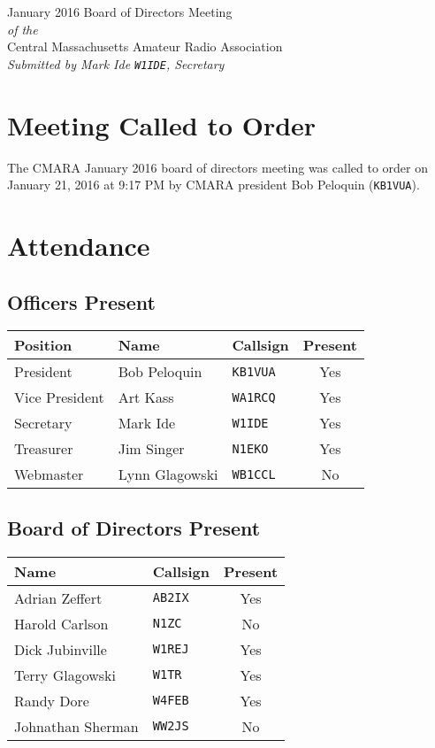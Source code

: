 \documentclass[10pt,letterpaper]{article}
\begin{document}
\begin{center}
{\huge January 2016 Board of Directors Meeting}\\
\emph{of the}\\
{\Large Central Massachusetts Amateur Radio Association}\\
\emph{Submitted by Mark Ide \texttt{W1IDE}, Secretary}
\end{center}

\section{Meeting Called to Order}
The CMARA January 2016 board of directors meeting was called to order on January 21, 2016 at 9:17 PM by CMARA president Bob Peloquin (\texttt{KB1VUA}).

\section{Attendance}

\subsection{Officers Present}

\begin{tabular}{|l|l|l|c|}
  \hline
  \textbf{Position} & \textbf{Name}  & \textbf{Callsign} & \textbf{Present} \\ \hline
  President         & Bob Peloquin   & \texttt{KB1VUA}   & Yes              \\
  Vice President    & Art Kass       & \texttt{WA1RCQ}   & Yes              \\
  Secretary         & Mark Ide       & \texttt{W1IDE}    & Yes              \\
  Treasurer         & Jim Singer     & \texttt{N1EKO}    & Yes              \\
  Webmaster         & Lynn Glagowski & \texttt{WB1CCL}   & No               \\
  \hline
\end{tabular}

\subsection{Board of Directors Present}

\begin{tabular}{|l|l|c|}
  \hline
  \textbf{Name}     & \textbf{Callsign} & \textbf{Present} \\ \hline
  Adrian Zeffert    & \texttt{AB2IX}    & Yes              \\
  Harold Carlson    & \texttt{N1ZC}     & No               \\
  Dick Jubinville   & \texttt{W1REJ}    & Yes              \\
  Terry Glagowski   & \texttt{W1TR}     & Yes              \\
  Randy Dore        & \texttt{W4FEB}    & Yes              \\
  Johnathan Sherman & \texttt{WW2JS}    & No               \\
  \hline
\end{tabular}
\end{document}
